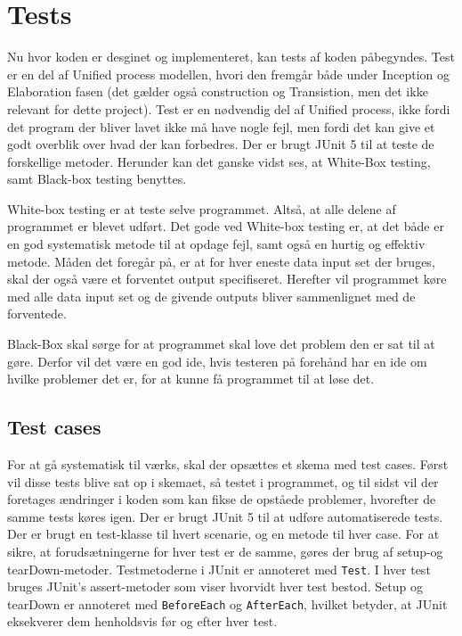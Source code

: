\chapter{Tests}\label{ch:tests}
Nu hvor koden er desginet og implementeret, kan tests af koden påbegyndes. Test er en del af Unified process modellen, hvori den fremgår både under Inception og Elaboration fasen (det gælder også construction og Transistion, men det ikke relevant for dette project). Test er en nødvendig del af Unified process, ikke fordi det program der bliver lavet ikke må have nogle fejl, men fordi det kan give et godt overblik over hvad der kan forbedres\cite{sestoft2008systematic}. Der er brugt JUnit 5 til at teste de forskellige metoder. Herunder kan det ganske vidst ses, at White-Box testing, samt Black-box testing benyttes. 

 White-box testing er at teste selve programmet. Altså, at alle delene af programmet er blevet udført. Det gode ved White-box testing er, at det både er en god systematisk metode til at opdage fejl, samt også en hurtig og effektiv metode. Måden det foregår på, er at for hver eneste data input set der bruges, skal der også være et forventet output specifiseret. Herefter vil programmet køre med alle data input set og de givende outputs bliver sammenlignet med de forventede\cite{sestoft2008systematic}.

Black-Box skal sørge for at programmet skal love det problem den er sat til at gøre. Derfor vil det være en god ide, hvis testeren på forehånd har en ide om hvilke problemer det er, for at kunne få programmet til at løse det\cite{sestoft2008systematic}. 

\section{Test cases}
For at gå systematisk til værks, skal der opsættes et skema med test cases\cite{Heumann}. Først vil disse tests blive sat op i skemaet, så testet i programmet, og til sidst vil der foretages ændringer i koden som kan fikse de opståede problemer, hvorefter de samme tests køres igen.
Der er brugt JUnit 5 \cite{JUnit} til at udføre automatiserede tests. Der er brugt en test-klasse til hvert scenarie, og en metode til hver case. For at sikre, at forudsætningerne for hver test er de samme, gøres der brug af setup-og tearDown-metoder. Testmetoderne i JUnit er annoteret med \verb|Test|. I hver test bruges JUnit’s assert-metoder som viser hvorvidt hver test bestod. Setup og tearDown er annoteret med \verb|BeforeEach| og \verb|AfterEach|, hvilket betyder, at JUnit eksekverer dem henholdsvis før og efter hver test\cite{MiniprojektTest}.
